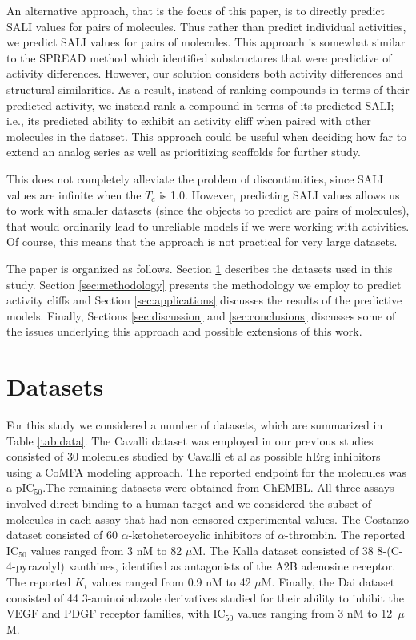 \documentclass[letterpaper, 12pt]{article}
\begin{document}
An alternative approach, that is the focus of this paper, is to directly predict SALI values for
pairs of molecules. Thus rather than predict individual activities, we predict SALI values for pairs
of molecules. This approach is somewhat similar to the SPREAD method \cite{Scheiber:2009fk} which
identified substructures that were predictive of activity differences. However, our solution
considers both activity differences and structural similarities. As a result, instead of ranking
compounds in terms of their predicted activity, we instead rank a compound in terms of its predicted
SALI; i.e., its predicted ability to exhibit an activity cliff when paired with other molecules in
the dataset. This approach could be useful when deciding how far to extend an analog series as well
as prioritizing scaffolds for further study.

This does not completely alleviate the problem of discontinuities, since SALI values are infinite
when the $T_c$ is 1.0.  However, predicting SALI values allows us to work with smaller datasets
(since the objects to predict are pairs of molecules), that would ordinarily lead to unreliable
models if we were working with activities. Of course, this means that the approach is not practical
for very large datasets.


The paper is organized as follows. Section \ref{sec:datasets} describes the datasets used in this
study. Section \ref{sec:methodology} presents the methodology we employ to predict activity cliffs
and Section \ref{sec:applications} discusses the results of the predictive models. Finally, Sections
\ref{sec:discussion} and \ref{sec:conclusions} discusses some of the issues underlying this approach
and possible extensions of this work.

\section{Datasets}            
\label{sec:datasets}
For this study we considered a number of datasets, which are summarized in Table \ref{tab:data}. The
Cavalli dataset was employed in our previous studies consisted of 30 molecules studied by Cavalli et
al\cite{Cavalli:2002aa} as possible hErg inhibitors using a CoMFA modeling approach. The reported
endpoint for the molecules was a pIC$_{50}$.The remaining datasets were obtained from ChEMBL. All
three assays involved direct binding to a human target and we considered the subset of molecules in
each assay that had non-censored experimental values. The Costanzo dataset\cite{Costanzo:2005uq}
consisted of 60 $\alpha$-ketoheterocyclic inhibitors of $\alpha$-thrombin. The reported
$\mathrm{IC_{50}}$ values ranged from 3 nM to 82 $\mu$M. The Kalla dataset\cite{Kalla:2006kx}
consisted of 38 8-(C-4-pyrazolyl) xanthines, identified as antagonists of the A2B adenosine
receptor. The reported $K_i$ values ranged from 0.9 nM to 42 $\mu$M. Finally, the Dai
dataset\cite{Dai:2007kl} consisted of 44 3-aminoindazole derivatives studied for their ability to
inhibit the VEGF and PDGF receptor families, with $\mathrm{IC_{50}}$ values ranging from 3 nM to
12~$\mu$M.
\end{document}
